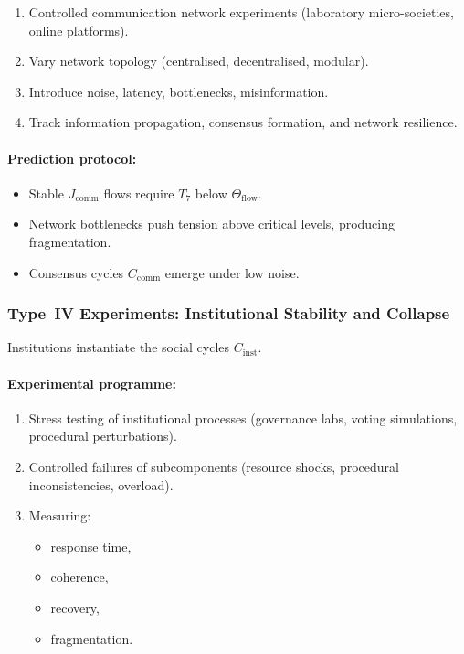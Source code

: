 \begin{enumerate}
    \item Controlled communication network experiments
          (laboratory micro-societies, online platforms).
    \item Vary network topology (centralised, decentralised, modular).
    \item Introduce noise, latency, bottlenecks, misinformation.
    \item Track information propagation, consensus formation,
          and network resilience.
\end{enumerate}

\paragraph{Prediction protocol:}

\begin{itemize}
    \item Stable $J_{\mathrm{comm}}$ flows require $T_7$ below
          $\Theta_{\mathrm{flow}}$.
    \item Network bottlenecks push tension above critical levels,
          producing fragmentation.
    \item Consensus cycles $C_{\mathrm{comm}}$ emerge under low noise.
\end{itemize}



\subsubsection{Type~IV Experiments: Institutional Stability and Collapse}

Institutions instantiate the social cycles $C_{\mathrm{inst}}$.

\paragraph{Experimental programme:}

\begin{enumerate}
    \item Stress testing of institutional processes (governance labs,
          voting simulations, procedural perturbations).
    \item Controlled failures of subcomponents (resource shocks,
          procedural inconsistencies, overload).
    \item Measuring:
          \begin{itemize}
              \item response time,
              \item coherence,
              \item recovery,
              \item fragmentation.
          \end{itemize}
\end{enumerate}

